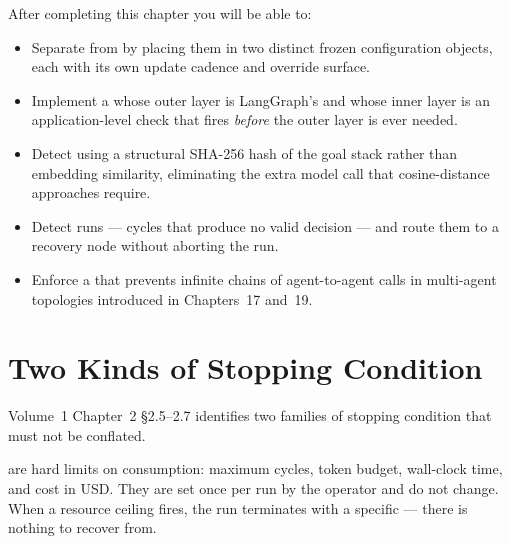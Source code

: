 


\begin{learningbox}
After completing this chapter you will be able to:
\begin{itemize}
  \item Separate  from 
        by placing them in two distinct frozen configuration objects,
        each with its own update cadence and override surface.
  \item Implement a  whose outer layer is
        LangGraph's  and whose inner layer is
        an application-level check that fires \emph{before} the outer
        layer is ever needed.
  \item Detect  using a structural SHA-256 hash of the
        goal stack rather than embedding similarity, eliminating the extra
        model call that cosine-distance approaches require.
  \item Detect  runs --- cycles that produce no valid
        decision --- and route them to a recovery node without aborting
        the run.
  \item Enforce a  that prevents infinite
        chains of agent-to-agent calls in multi-agent topologies
        introduced in Chapters~17 and~19.
\end{itemize}
\end{learningbox}

\section{Two Kinds of Stopping Condition}
\label{sec:two-kinds}

Volume~1 Chapter~2 §2.5--2.7 identifies two families of stopping condition
that must not be conflated.

 are hard limits on consumption: maximum cycles,
token budget, wall-clock time, and cost in USD.  They are set once per
run by the operator and do not change.  When a resource ceiling fires, the
run terminates with a specific  --- there is
nothing to recover from.

